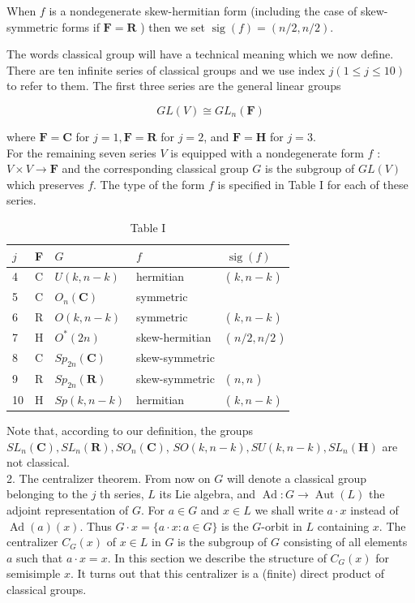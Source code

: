 \documentclass[10pt]{article}
\begin{document}
When $f$ is a nondegenerate skew-hermitian form (including the case of skew-symmetric forms if $\mathbf{F}=\mathbf{R}$ ) then we set $\operatorname{sig}(f)=(n / 2, n / 2)$.

The words classical group will have a technical meaning which we now define. There are ten infinite series of classical groups and we use index $j(1 \leqslant j \leqslant 10)$ to refer to them. The first three series are the general linear groups

$$
G L(V) \cong G L_{n}(\mathbf{F})
$$

where $\mathbf{F}=\mathbf{C}$ for $j=1, \mathbf{F}=\mathbf{R}$ for $j=2$, and $\mathbf{F}=\mathbf{H}$ for $j=3$.\\
For the remaining seven series $V$ is equipped with a nondegenerate form $f$ : $V \times V \rightarrow \mathbf{F}$ and the corresponding classical group $G$ is the subgroup of $G L(V)$ which preserves $f$. The type of the form $f$ is specified in Table I for each of these series.

\begin{table}[h]
\begin{center}
\begin{tabular}[t]{|l|l|l|l|l|}
\hline
$j$ & F & $G$ & $f$ & $\operatorname{sig}(f)$ \\
\hline
4 & C & $U(k, n-k)$ & hermitian & ( $k, n-k$ ) \\
\hline
5 & C & $O_{n}(\mathbf{C})$ & symmetric &  \\
\hline
6 & R & $O(k, n-k)$ & symmetric & ( $k, n-k$ ) \\
\hline
7 & H & $O^{*}(2 n)$ & skew-hermitian & ( $n / 2, n / 2$ ) \\
\hline
8 & C & $S p_{2 n}(\mathbf{C})$ & skew-symmetric &  \\
\hline
9 & R & $S p_{2 n}(\mathbf{R})$ & skew-symmetric & ( $n, n$ ) \\
\hline
10 & H & $S p(k, n-k)$ & hermitian & ( $k, n-k$ ) \\
\hline
\end{tabular}
\captionsetup{labelformat=empty}
\caption{Table I}
\end{center}
\end{table}

Note that, according to our definition, the groups $S L_{n}(\mathbf{C}), S L_{n}(\mathbf{R}), S O_{n}(\mathbf{C})$, $S O(k, n-k), S U(k, n-k), S L_{n}(\mathbf{H})$ are not classical.\\
2. The centralizer theorem. From now on $G$ will denote a classical group belonging to the $j$ th series, $L$ its Lie algebra, and $\operatorname{Ad}: G \rightarrow \operatorname{Aut}(L)$ the adjoint representation of $G$. For $a \in G$ and $x \in L$ we shall write $a \cdot x$ instead of $\operatorname{Ad}(a)(x)$. Thus $G \cdot x=\{a \cdot x: a \in G\}$ is the $G$-orbit in $L$ containing $x$. The centralizer $C_{G}(x)$ of $x \in L$ in $G$ is the subgroup of $G$ consisting of all elements $a$ such that $a \cdot x=x$. In this section we describe the structure of $C_{G}(x)$ for semisimple $x$. It turns out that this centralizer is a (finite) direct product of classical groups.
\end{document}

